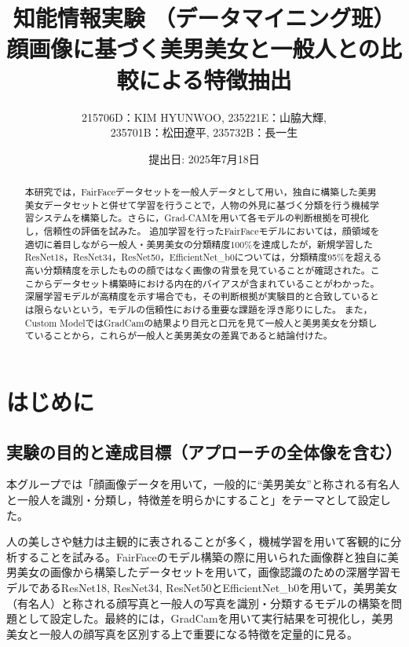 \documentclass[a4paper,11pt,titlepage]{jsarticle}
\begin{document}
\title{知能情報実験 （データマイニング班） \\ 顔画像に基づく美男美女と一般人との比較による特徴抽出}
\author{215706D：KIM HYUNWOO, 235221E：山脇大輝,\\ 235701B：松田遼平, 235732B：長一生}
\date{提出日: 2025年7月18日}
\maketitle

\tableofcontents
\clearpage

\begin{abstract}
\label{label:abstract}
本研究では，FairFaceデータセットを一般人データとして用い，独自に構築した美男美女データセットと併せて学習を行うことで，人物の外見に基づく分類を行う機械学習システムを構築した。さらに，Grad-CAMを用いて各モデルの判断根拠を可視化し，信頼性の評価を試みた。
追加学習を行ったFairFaceモデルにおいては，顔領域を適切に着目しながら一般人・美男美女の分類精度100\%を達成したが，新規学習したResNet18，ResNet34，ResNet50，EfficientNet\_b0については，分類精度95\%を超える高い分類精度を示したものの顔ではなく画像の背景を見ていることが確認された。ここからデータセット構築時における内在的バイアスが含まれていることがわかった。深層学習モデルが高精度を示す場合でも，その判断根拠が実験目的と合致しているとは限らないという，モデルの信頼性における重要な課題を浮き彫りにした。
また，Custom ModelではGradCamの結果より目元と口元を見て一般人と美男美女を分類していることから，これらが一般人と美男美女の差異であると結論付けた。
\end{abstract} 


\section{はじめに}
\label{label:はじめに}
\subsection{実験の目的と達成目標（アプローチの全体像を含む）}
本グループでは「顔画像データを用いて，一般的に“美男美女”と称される有名人と一般人を識別・分類し，特徴差を明らかにすること」をテーマとして設定した。

人の美しさや魅力は主観的に表されることが多く，機械学習を用いて客観的に分析することを試みる。FairFaceのモデル構築の際に用いられた画像群と独自に美男美女の画像から構築したデータセットを用いて，画像認識のための深層学習モデルであるResNet18, ResNet34, ResNet50とEfficientNet\_b0を用いて，美男美女（有名人）と称される顔写真と一般人の写真を識別・分類するモデルの構築を問題として設定した。最終的には，GradCamを用いて実行結果を可視化し，美男美女と一般人の顔写真を区別する上で重要になる特徴を定量的に見る。
\end{document}
